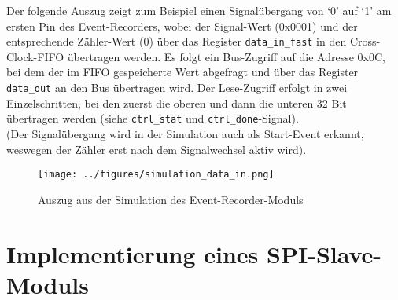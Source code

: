 {Der folgende Auszug zeigt zum Beispiel einen Signalübergang von `0' auf `1' am ersten Pin des Event-Recorders, wobei der Signal-Wert (0x0001) und der entsprechende Zähler-Wert (0) über das Register {\tt data\_in\_fast} in den Cross-Clock-FIFO übertragen werden. Es folgt ein Bus-Zugriff auf die Adresse 0x0C, bei dem der im FIFO gespeicherte Wert abgefragt und über das Register {\tt data\_out} an den Bus übertragen wird. Der Lese-Zugriff erfolgt in zwei Einzelschritten, bei den zuerst die oberen und dann die unteren 32 Bit übertragen werden (siehe {\tt ctrl\_stat} und {\tt ctrl\_done}-Signal). \\
(Der Signalübergang wird in der Simulation auch als Start-Event erkannt, weswegen der Zähler erst nach dem Signalwechsel aktiv wird). 
\begin{figure}[H]
	\centering
	\captionsetup{justification=centering,margin=2cm}
		\texttt{[image: ../figures/simulation\_data\_in.png]}
		\caption[Auszug aus der Simulation des Event-Recorder-Moduls]{Auszug aus der Simulation des Event-Recorder-Moduls}
	\label{fig:ice40_pmod_pins}
\end{figure}

\section{Implementierung eines SPI-Slave-Moduls}
\label{ch:Implementierung:sec:SPI-Slave}

}

